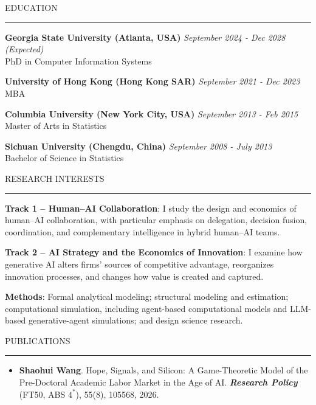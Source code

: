 \documentclass{resume}
\renewenvironment{rSection}[1]{
\Needspace{5\baselineskip}
\sectionskip
\textcolor{RoyalPurple}{\MakeUppercase{#1}}
\sectionlineskip
\hrule
\begin{list}{}{
\setlength{\leftmargin}{1.5em}
}
\item[]
}{
\end{list}
}
\begin{document}
\begin{rSection}{Education}
{\bf Georgia State University (Atlanta, USA)} \hfill {\em September 2024 - Dec 2028 (Expected)}
\\ PhD in Computer Information Systems

{\bf University of Hong Kong (Hong Kong SAR)} \hfill {\em September 2021 - Dec 2023}
\\ MBA

{\bf Columbia University (New York City, USA)} \hfill {\em September 2013 - Feb 2015}
\\ Master of Arts in Statistics

{\bf Sichuan University (Chengdu, China)} \hfill {\em September 2008 - July 2013}
\\ Bachelor of Science in Statistics

\end{rSection}

\begin{rSection}{Research Interests}

\textbf{Track 1 -- Human--AI Collaboration}: I study the design and economics of human--AI collaboration, with particular emphasis on delegation, decision fusion, coordination, and complementary intelligence in hybrid human--AI teams.

\textbf{Track 2 -- AI Strategy and the Economics of Innovation}: I examine how generative AI alters firms' sources of competitive advantage, reorganizes innovation processes, and changes how value is created and captured.

\textbf{Methods}: Formal analytical modeling; structural modeling and estimation; computational simulation, including agent-based computational models and LLM-based generative-agent simulations; and design science research.
\end{rSection}

\begin{rSection}{Publications}
\begin{itemize}[leftmargin=0.7em]
    \item \textbf{Shaohui Wang}. Hope, Signals, and Silicon: A Game-Theoretic Model of the Pre-Doctoral Academic Labor Market in the Age of AI. \textbf{\textit{Research Policy}} (FT50, ABS $4^{*}$), 55(8), 105568, 2026.
\end{itemize}
\end{rSection}
\end{document}

